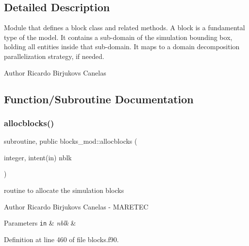 \subsection{Detailed Description}
Module that defines a block class and related methods. A block is a fundamental type of the model. It contains a sub-\/domain of the simulation bounding box, holding all entities inside that sub-\/domain. It maps to a domain decomposition parallelization strategy, if needed. 

\begin{DoxyAuthor}{Author}
Ricardo Birjukovs Canelas 
\end{DoxyAuthor}


\subsection{Function/\+Subroutine Documentation}
\mbox{\label{namespaceblocks__mod_a639beb0fee2290d46353f4b4702d6711}} 
\subsubsection{\texorpdfstring{allocblocks()}{allocblocks()}}
{\footnotesize\ttfamily subroutine, public blocks\+\_\+mod\+::allocblocks (\begin{DoxyParamCaption}\item[{integer, intent(in)}]{nblk }\end{DoxyParamCaption})}



routine to allocate the simulation blocks 

\begin{DoxyAuthor}{Author}
Ricardo Birjukovs Canelas -\/ M\+A\+R\+E\+T\+EC 
\end{DoxyAuthor}

\begin{DoxyParams}[1]{Parameters}
\mbox{\tt in}  & {\em nblk} & \\
\hline
\end{DoxyParams}


Definition at line 460 of file blocks.\+f90.


